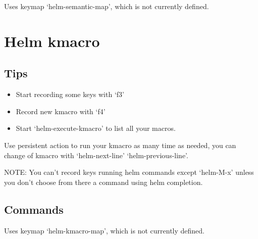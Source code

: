 \documentclass[11pt]{article}
\begin{document}
Uses keymap ‘helm-semantic-map’, which is not currently defined.


\section{Helm kmacro}
\label{sec:org6bc5c35}

\subsection{Tips}
\label{sec:org6fae82c}

\begin{itemize}
\item Start recording some keys with ‘f3’
\item Record new kmacro with ‘f4’
\item Start ‘helm-execute-kmacro’ to list all your macros.
\end{itemize}

Use persistent action to run your kmacro as many time as needed,
you can change of kmacro with ‘helm-next-line’ ‘helm-previous-line’.

NOTE: You can’t record keys running helm commands except ‘helm-M-x’ unless
you don’t choose from there a command using helm completion.

\subsection{Commands}
\label{sec:org6f8b9b3}

Uses keymap ‘helm-kmacro-map’, which is not currently defined.
\end{document}
